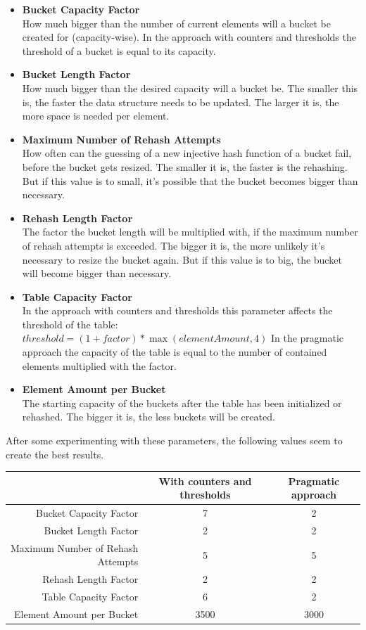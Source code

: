 \documentclass{article}
\begin{document}
\begin{itemize}
  \item \textbf{Bucket Capacity Factor}\\
  	How much bigger than the number of current elements will a bucket be created for (capacity-wise). In the approach with counters and thresholds the threshold of a bucket is equal to its capacity.
  \item \textbf{Bucket Length Factor}\\
    How much bigger than the desired capacity will a bucket be. The smaller this is, the faster the data structure needs to be updated. The larger it is, the more space is needed per element.
  \item \textbf{Maximum Number of Rehash Attempts}\\
  	How often can the guessing of a new injective hash function of a bucket fail, before the bucket gets resized. The smaller it is, the faster is the rehashing. But if this value is to small, it's possible that the bucket becomes bigger than necessary.
  \item \textbf{Rehash Length Factor}\\
    The factor the bucket length will be multiplied with, if the maximum number of rehash attempts is exceeded. The bigger it is, the more unlikely it's necessary to resize the bucket again. But if this value is to big, the bucket will become bigger than necessary.
  \item \textbf{Table Capacity Factor}\\
    In the approach with counters and thresholds this parameter affects the threshold of the table: $ threshold = (1 + factor) * \max(elementAmount, 4) $
    In the pragmatic approach the capacity of the table is equal to the number of contained elements multiplied with the factor.
  \item \textbf{Element Amount per Bucket}\\
    The starting capacity of the buckets after the table has been initialized or rehashed. The bigger it is, the less buckets will be created.
\end{itemize}

After some experimenting with these parameters, the following values seem to create the best results.

\begin{tabulary}{\textwidth}{R|C|C}
& With counters \newline and thresholds & Pragmatic approach \\ 
\hline Bucket Capacity Factor & 7 & 2 \\ 
\hline Bucket Length Factor & 2 & 2 \\ 
\hline Maximum Number of Rehash Attempts & 5 & 5 \\ 
\hline Rehash Length Factor & 2 & 2 \\ 
\hline Table Capacity Factor & 6 & 2 \\ 
\hline Element Amount per Bucket & 3500 & 3000 \\
\end{tabulary} 
\end{document}
